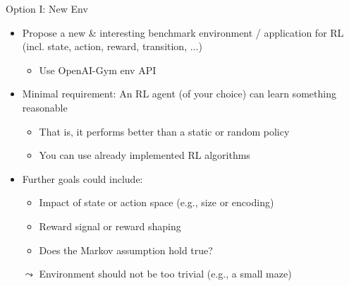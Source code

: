 \begin{frame}[c]{Option I: New Env}
	
	\begin{itemize}
		\item Propose a new \& interesting benchmark environment / application for RL (incl. state, action, reward, transition, $\ldots$)
		\begin{itemize}
			\item Use OpenAI-Gym env API
		\end{itemize}
		\item Minimal requirement: An RL agent (of your choice) can learn something reasonable
		\begin{itemize}
			\item That is, it performs better than a static or random policy
			\item You can use already implemented RL algorithms
		\end{itemize}
		\item Further goals could include:
		\begin{itemize}
			\item Impact of state or action space (e.g., size or encoding)
			\item Reward signal or reward shaping
			\item Does the Markov assumption hold true?
		\end{itemize}
		\item[$\leadsto$] Environment should not be too trivial (e.g., a small maze)
	\end{itemize}
	
\end{frame}
